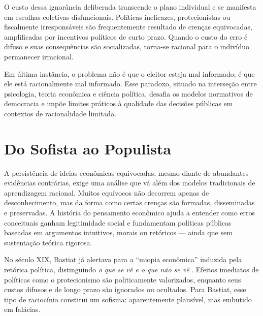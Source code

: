 O custo dessa ignorância deliberada transcende o plano individual e se manifesta em escolhas coletivas disfuncionais. Políticas ineficazes, protecionistas ou fiscalmente irresponsáveis são frequentemente resultado de crenças equivocadas, amplificadas por incentivos políticos de curto prazo. Quando o custo do erro é difuso e suas consequências são socializadas, torna-se racional para o indivíduo permanecer irracional.

Em última instância, o problema não é que o eleitor esteja mal informado; é que ele está racionalmente mal informado. Esse paradoxo, situado na interseção entre psicologia, teoria econômica e ciência política, desafia os modelos normativos de democracia e impõe limites práticos à qualidade das decisões públicas em contextos de racionalidade limitada.

\section{Do Sofista ao Populista} %


A persistência de ideias econômicas equivocadas, mesmo diante de abundantes evidências contrárias, exige uma análise que vá além dos modelos tradicionais de aprendizagem racional. Muitos equívocos não decorrem apenas de desconhecimento, mas da forma como certas crenças são formadas, disseminadas e preservadas. A história do pensamento econômico ajuda a entender como erros conceituais ganham legitimidade social e fundamentam políticas públicas baseadas em argumentos intuitivos, morais ou retóricos — ainda que sem sustentação teórica rigorosa.


No século XIX, Bastiat já alertava para a ``miopia econômica'' induzida pela retórica política, distinguindo \textit{o que se vê e o que não se vê} \cite{bastiat1859sofismas}. Efeitos imediatos de políticas como o protecionismo são politicamente valorizados, enquanto seus custos difusos e de longo prazo são ignorados ou ocultados. Para Bastiat, esse tipo de raciocínio constitui um sofisma: aparentemente plausível, mas embutido em falácias.

